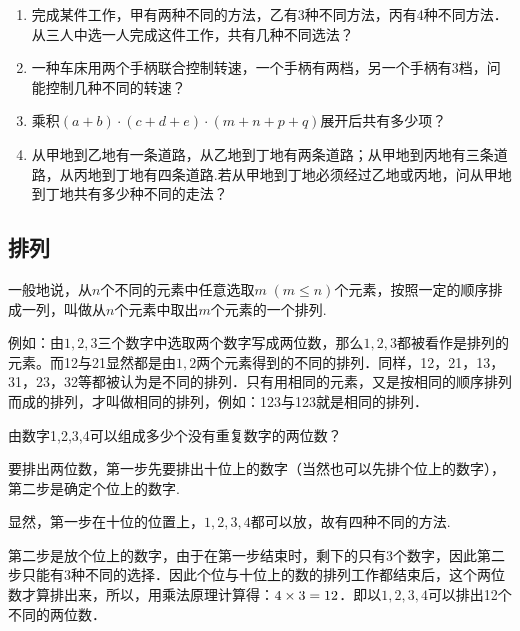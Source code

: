 \begin{ex}
\begin{enumerate}
    \item 完成某件工作，甲有两种不同的方法，乙有3种不同方法，丙有4种不同方法．从三人中选一人完成这件工作，共有几种不同选法？
    \item 一种车床用两个手柄联合控制转速，一个手柄有两档，另一个手柄有3档，问能控制几种不同的转速？
    \item 乘积$(a+b)\cdot (c+d+e)\cdot (m+n+p+q)$展开后共有多少项？
    \item 从甲地到乙地有一条道路，从乙地到丁地有两条道路；从甲地到丙地有三条道路，从丙地到丁地有四条道路.若从甲地到丁地必须经过乙地或丙地，问从甲地到丁地共有多少种不同的走法？
\end{enumerate}
\end{ex}


\subsection{排列}
一般地说，从$n$个不同的元素中任意选取$m\; (m\le n)$个元素，按照一定的顺序排成一列，叫做从$n$个元素中取出$m$个元素的一个排列.

例如：由$1,2,3$三个数字中选取两个数字写成两位数，那么$1,2,3$都被看作是排列的元素。而12与21显然都是由$1,2$两个元素得到的不同的排列．同样，12，21，13，31，23，32等都被认为是不同的排列．只有用相同的元素，又是按相同的顺序排列而成的排列，才叫做相同的排列，例如：123与123就是相同的排列．

\begin{example}
    由数字1,2,3,4可以组成多少个没有重复数字的两位数？
\end{example}

\begin{solution}
    要排出两位数，第一步先要排出十位上的数字（当然也可以先排个位上的数字），第二步是确定个位上的数字.

显然，第一步在十位的位置上，$1,2,3,4$都可以放，故有四种不同的方法.

第二步是放个位上的数字，由于在第一步结束时，剩下的只有3个数字，因此第二步只能有3种不同的选择．因此个位与十位上的数的排列工作都结束后，这个两位数才算排出来，所以，用乘法原理计算得：$4\times3=12$．即以$1,2,3,4$可以排出12个不同的两位数．
\end{solution}

